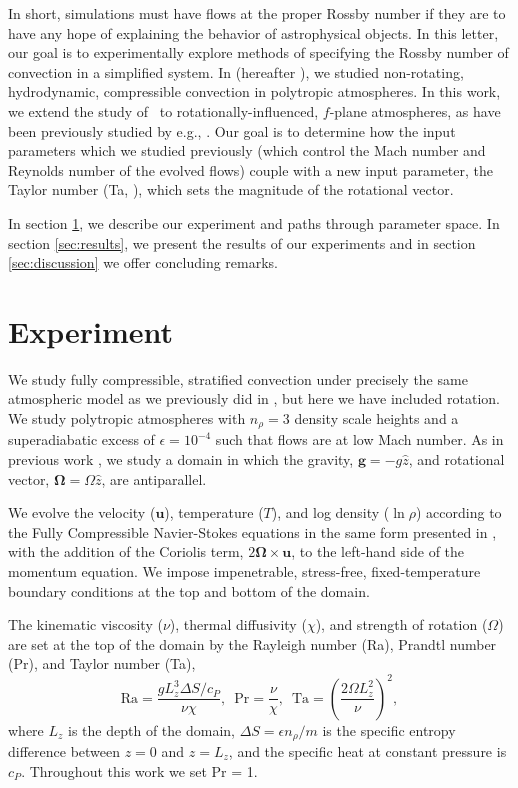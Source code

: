 \documentclass[twocolumn, amsmath, amsfonts, amssymb]{aastex62}
\begin{document}
In short, simulations must have flows
at the proper Rossby number if they are to have any hope of explaining the behavior of
astrophysical objects.
In this letter, our goal is to experimentally explore methods of specifying the Rossby number
of convection in a simplified system.
In \cite{anders&brown2017} (hereafter \AB), we studied non-rotating, hydrodynamic, 
compressible convection in polytropic atmospheres. 
In this work, we extend the study of \AB$\,$ to rotationally-influenced, $f$-plane
atmospheres, as have been previously studied by e.g.,
\cite{brummell&all1996, brummell&all1998, calkins&all2015a}. Our goal is to determine
how the input parameters which we studied previously (which control the Mach number and
Reynolds number of the evolved flows) couple with a new input
parameter, the Taylor number (Ta, \cite{julien&all1996}), which sets the magnitude of the
rotational vector. 

In section  \ref{sec:experiment}, we describe our experiment and paths through parameter space. 
In section \ref{sec:results}, we present
the results of our experiments and in section \ref{sec:discussion} we offer concluding remarks.

\section{Experiment} 
\label{sec:experiment}
We study fully compressible, stratified 
convection under precisely the same atmospheric model
as we previously did in \AB, but here
we have included rotation. We study polytropic atmospheres
with $n_\rho = 3$ density scale heights and a superadiabatic
excess of $\epsilon = 10^{-4}$ such that flows are at low Mach number.
As in previous work \citep{julien&all1996, brummell&all1996}, 
we study a domain in which the
gravity, $\bm{g} = -g\hat{z}$, and rotational vector, $\bm{\Omega} = \Omega \hat{z}$, 
are antiparallel.

We evolve the velocity ($\bm{u}$), temperature ($T$), 
and log density ($\ln\rho$) according to the
Fully Compressible Navier-Stokes equations in the same form presented in \AB, with the
addition of the Coriolis term, $2\bm{\Omega}\times\bm{u}$, to the left-hand side
of the momentum equation. We impose impenetrable, stress-free, fixed-temperature boundary
conditions at the top and bottom of the domain.


The kinematic viscosity ($\nu$), thermal diffusivity ($\chi$), and strength of
rotation ($\Omega$) are set at the top of the domain by the Rayleigh number
(Ra), Prandtl number (Pr), and Taylor number (Ta),
\begin{equation}
    \text{Ra} = \frac{g L_z^3 \Delta S / c_P}{\nu \chi}, \,\,\,
    \text{Pr} = \frac{\nu}{\chi}, \,\,\,
    \text{Ta} = \left(\frac{2 \Omega L_z^2}{\nu}\right)^2,
\end{equation}
where $L_z$ is the depth of the domain, 
$\Delta S = \epsilon n_\rho / m$ is the specific entropy difference between
$z = 0$ and $z = L_z$, and the specific heat at constant pressure is $c_P$.
Throughout this work we set Pr = 1.
\end{document}
